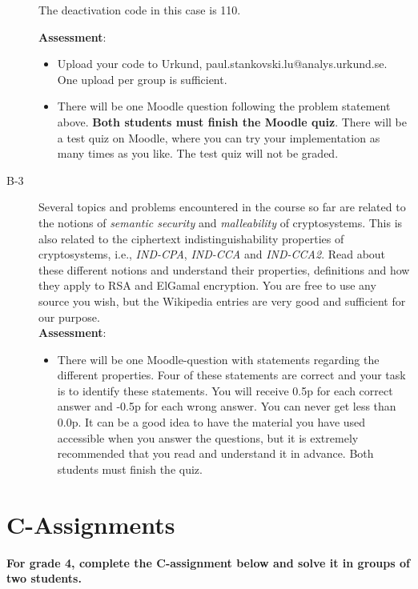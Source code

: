 \documentclass{article}
\begin{document}
\begin{description}
{			The deactivation code in this case is 110.
			
			\textbf{Assessment}:
			\begin{itemize}
				\item Upload your code to Urkund, paul.stankovski.lu@analys.urkund.se.
				One upload per group is sufficient.
				
				\item There will be one Moodle question following the problem statement above. 
				\textbf{Both students must finish the Moodle quiz}.
				There will be a test quiz on Moodle, where you can try your implementation as many times as you like. 
				The test quiz will not be graded.
			\end{itemize}}
			
			\item[B-3]{Several topics and problems encountered in the course so far are related to the notions of \textit{semantic security} and \textit{malleability} of cryptosystems. This is also related to the ciphertext indistinguishability properties of cryptosystems, i.e., \textit{IND-CPA}, \textit{IND-CCA} and \textit{IND-CCA2}. Read about these different notions and understand their properties, definitions and how they apply to RSA and ElGamal encryption. You are free to use any source you wish, but the Wikipedia entries are very good and sufficient for our purpose.\\
				\textbf{Assessment}:
				\begin{itemize}
					\item There will be one Moodle-question with statements regarding the different properties. Four of these statements are correct and your task is to identify these statements. You will receive 0.5p for each correct answer and -0.5p for each wrong answer. You can never get less than 0.0p. It can be a good idea to have the material you have used accessible when you answer the questions, but it is extremely recommended that you read and understand it in advance. Both students must finish the quiz.
				\end{itemize}}
				
				
			\end{description}
			
			\section*{C-Assignments}
			\textbf{For grade 4, complete the C-assignment below and solve it in groups of two students.}
			
\end{document}
